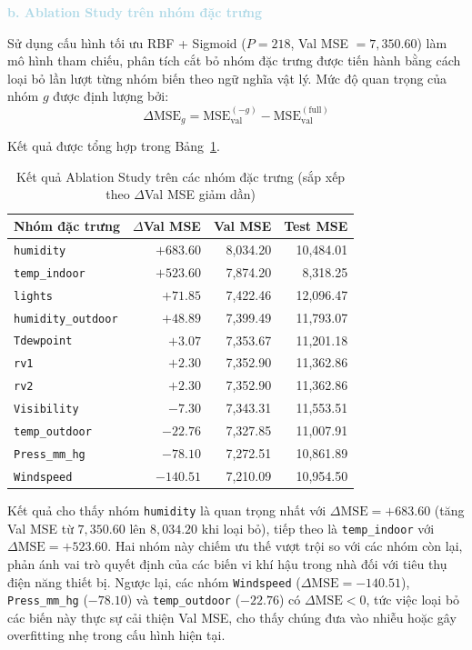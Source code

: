 \noindent\textcolor{lightblue}{\textbf{b. Ablation Study trên nhóm đặc trưng}}

Sử dụng cấu hình tối ưu RBF + Sigmoid ($P=218$, Val MSE $= 7{,}350.60$)
làm mô hình tham chiếu, phân tích cắt bỏ nhóm đặc trưng được tiến hành
bằng cách loại bỏ lần lượt từng nhóm biến theo ngữ nghĩa vật lý. Mức độ
quan trọng của nhóm $g$ được định lượng bởi:
$$\Delta\mathrm{MSE}_g
  = \mathrm{MSE}_{\mathrm{val}}^{(-g)} - \mathrm{MSE}_{\mathrm{val}}^{(\mathrm{full})}$$

Kết quả được tổng hợp trong Bảng~\ref{tab:feature_ablation}.

\begin{table}[H]
\centering
\caption{Kết quả Ablation Study trên các nhóm đặc trưng (sắp xếp theo $\Delta$Val MSE giảm dần)}
\label{tab:feature_ablation}
\begin{tabular}{lrrr}
\hline
\textbf{Nhóm đặc trưng} & \textbf{$\Delta$Val MSE} & \textbf{Val MSE} & \textbf{Test MSE} \\
\hline
\texttt{humidity}         & $+683.60$ & 8{,}034.20 & 10{,}484.01 \\
\texttt{temp\_indoor}     & $+523.60$ & 7{,}874.20 & 8{,}318.25  \\
\texttt{lights}           & $+71.85$  & 7{,}422.46 & 12{,}096.47 \\
\texttt{humidity\_outdoor}& $+48.89$  & 7{,}399.49 & 11{,}793.07 \\
\texttt{Tdewpoint}        & $+3.07$   & 7{,}353.67 & 11{,}201.18 \\
\texttt{rv1}              & $+2.30$   & 7{,}352.90 & 11{,}362.86 \\
\texttt{rv2}              & $+2.30$   & 7{,}352.90 & 11{,}362.86 \\
\texttt{Visibility}       & $-7.30$   & 7{,}343.31 & 11{,}553.51 \\
\texttt{temp\_outdoor}    & $-22.76$  & 7{,}327.85 & 11{,}007.91 \\
\texttt{Press\_mm\_hg}    & $-78.10$  & 7{,}272.51 & 10{,}861.89 \\
\texttt{Windspeed}        & $-140.51$ & 7{,}210.09 & 10{,}954.50 \\
\hline
\end{tabular}
\end{table}

Kết quả cho thấy nhóm \texttt{humidity} là quan trọng nhất với
$\Delta\mathrm{MSE} = +683.60$ (tăng Val MSE từ $7{,}350.60$ lên
$8{,}034.20$ khi loại bỏ), tiếp theo là \texttt{temp\_indoor} với
$\Delta\mathrm{MSE} = +523.60$. Hai nhóm này chiếm ưu thế vượt trội so
với các nhóm còn lại, phản ánh vai trò quyết định của các biến vi khí hậu
trong nhà đối với tiêu thụ điện năng thiết bị. Ngược lại, các nhóm
\texttt{Windspeed} ($\Delta\mathrm{MSE} = -140.51$), \texttt{Press\_mm\_hg}
($-78.10$) và \texttt{temp\_outdoor} ($-22.76$) có $\Delta\mathrm{MSE} < 0$,
tức việc loại bỏ các biến này thực sự cải thiện Val MSE, cho thấy chúng
đưa vào nhiễu hoặc gây overfitting nhẹ trong cấu hình hiện tại.

